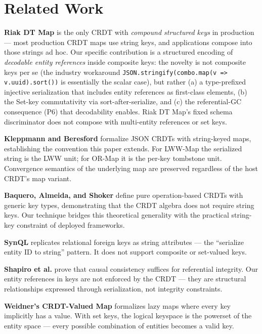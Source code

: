 \section{Related Work}

\textbf{Riak DT Map} \cite{riakdtmap} is the only CRDT with \emph{compound structured keys} in production --- most production CRDT maps use string keys, and applications compose into those strings ad hoc. Our specific contribution is a structured encoding of \emph{decodable entity references} inside composite keys: the novelty is not composite keys per se (the industry workaround \texttt{JSON.stringify(combo.map(v =\textgreater{} v.uuid).sort())} is essentially the scalar case), but rather (a) a type-prefixed injective serialization that includes entity references as first-class elements, (b) the Set-key commutativity via sort-after-serialize, and (c) the referential-GC consequence (P6) that decodability enables. Riak DT Map's fixed schema discriminator does not compose with multi-entity references or set keys.

\textbf{Kleppmann and Beresford} \cite{kleppmann2017automerge} formalize JSON CRDTs with string-keyed maps, establishing the convention this paper extends. For LWW-Map the serialized string is the LWW unit; for OR-Map it is the per-key tombstone unit. Convergence semantics of the underlying map are preserved regardless of the host CRDT's map variant.

\textbf{Baquero, Almeida, and Shoker} \cite{baquero2017pure} define pure operation-based CRDTs with generic key types, demonstrating that the CRDT algebra does not require string keys. Our technique bridges this theoretical generality with the practical string-key constraint of deployed frameworks.

\textbf{SynQL} \cite{synql2024} replicates relational foreign keys as string attributes --- the ``serialize entity ID to string'' pattern. It does not support composite or set-valued keys.

\textbf{Shapiro et al.} \cite{shapiro2018integrity} prove that causal consistency suffices for referential integrity. Our entity references in keys are not enforced by the CRDT --- they are structural relationships expressed through serialization, not integrity constraints.

\textbf{Weidner's CRDT-Valued Map} \cite{weidner2022collab} formalizes lazy maps where every key implicitly has a value. With set keys, the logical keyspace is the powerset of the entity space --- every possible combination of entities becomes a valid key.

